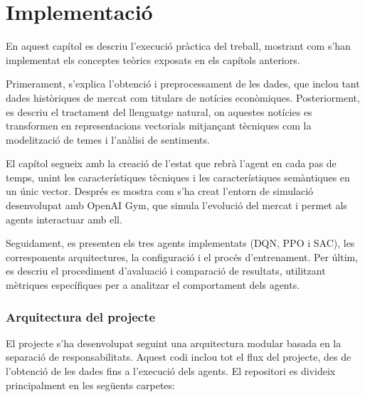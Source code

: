 \documentclass[12pt,a4paper,twoside]{book}
\begin{document}
\chapter{Implementació}

En aquest capítol es descriu l'execució pràctica del treball, mostrant com s'han implementat els conceptes teòrics exposats en els capítols anteriors.

Primerament, s'explica l'obtenció i preprocessament de les dades, que inclou tant dades històriques de mercat com titulars de notícies econòmiques. Posteriorment, es descriu el tractament del llenguatge natural, on aquestes notícies es transformen en representacions vectorials mitjançant tècniques com la modelització de temes i l'anàlisi de sentiments.

El capítol segueix amb la creació de l'estat que rebrà l'agent en cada pas de temps, unint les característiques tècniques i les característiques semàntiques en un únic vector. Després es mostra com s'ha creat l'entorn de simulació desenvolupat amb OpenAI Gym, que simula l'evolució del mercat i permet als agents interactuar amb ell.

Seguidament, es presenten els tres agents implementats (DQN, PPO i SAC), les corresponents arquitectures, la configuració i el procés d'entrenament. Per últim, es descriu el procediment d'avaluació i comparació de resultats, utilitzant mètriques específiques per a analitzar el comportament dels agents.

\subsection{Arquitectura del projecte}
El projecte s'ha desenvolupat seguint una arquitectura modular basada en la separació de responsabilitats. Aquest codi inclou tot el flux del projecte, des de l'obtenció de les dades fins a l'execució dels agents. El repositori es divideix principalment en les següents carpetes:
\end{document}

